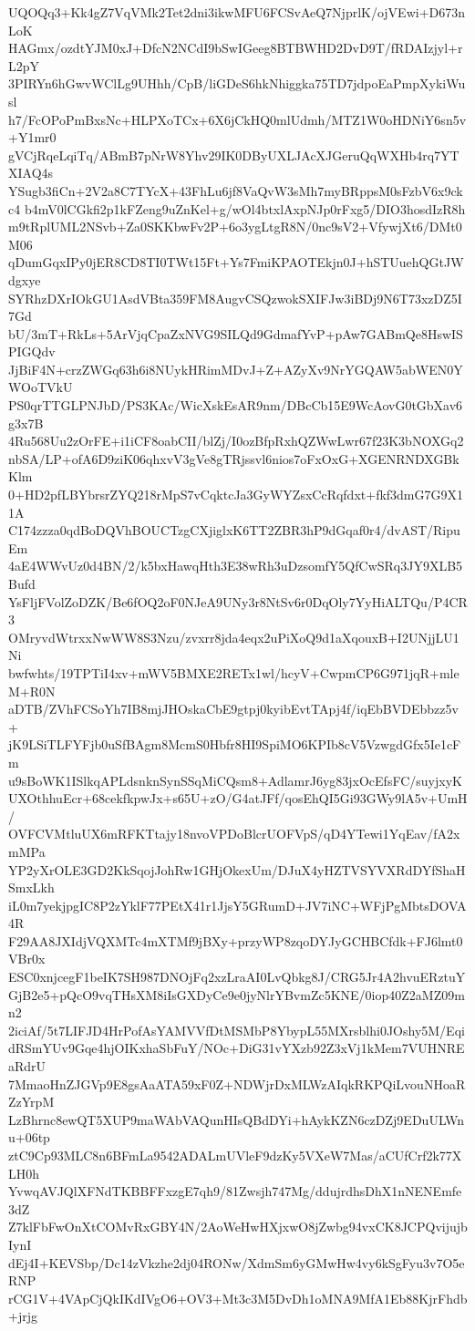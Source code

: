 UQOQq3+Kk4gZ7VqVMk2Tet2dni3ikwMFU6FCSvAeQ7NjprlK/ojVEwi+D673nLoK
HAGmx/ozdtYJM0xJ+DfcN2NCdI9bSwIGeeg8BTBWHD2DvD9T/fRDAIzjyl+rL2pY
3PIRYn6hGwvWClLg9UHhh/CpB/liGDeS6hkNhiggka75TD7jdpoEaPmpXykiWusl
h7/FcOPoPmBxsNc+HLPXoTCx+6X6jCkHQ0mlUdmh/MTZ1W0oHDNiY6sn5v+Y1mr0
gVCjRqeLqiTq/ABmB7pNrW8Yhv29IK0DByUXLJAcXJGeruQqWXHb4rq7YTXIAQ4s
YSugb3fiCn+2V2a8C7TYcX+43FhLu6jf8VaQvW3sMh7myBRppsM0sFzbV6x9ckc4
b4mV0lCGkfi2p1kFZeng9uZnKel+g/wOl4btxlAxpNJp0rFxg5/DIO3hosdIzR8h
m9tRplUML2NSvb+Za0SKKbwFv2P+6o3ygLtgR8N/0nc9sV2+VfywjXt6/DMt0M06
qDumGqxIPy0jER8CD8TI0TWt15Ft+Ys7FmiKPAOTEkjn0J+hSTUuehQGtJWdgxye
SYRhzDXrIOkGU1AsdVBta359FM8AugvCSQzwokSXIFJw3iBDj9N6T73xzDZ5I7Gd
bU/3mT+RkLs+5ArVjqCpaZxNVG9SILQd9GdmafYvP+pAw7GABmQe8HswISPIGQdv
JjBiF4N+crzZWGq63h6i8NUykHRimMDvJ+Z+AZyXv9NrYGQAW5abWEN0YWOoTVkU
PS0qrTTGLPNJbD/PS3KAc/WicXskEsAR9nm/DBcCb15E9WcAovG0tGbXav6g3x7B
4Ru568Uu2zOrFE+i1iCF8oabCII/blZj/I0ozBfpRxhQZWwLwr67f23K3bNOXGq2
nbSA/LP+ofA6D9ziK06qhxvV3gVe8gTRjssvl6nios7oFxOxG+XGENRNDXGBkKlm
0+HD2pfLBYbrsrZYQ218rMpS7vCqktcJa3GyWYZsxCcRqfdxt+fkf3dmG7G9X11A
C174zzza0qdBoDQVhBOUCTzgCXjiglxK6TT2ZBR3hP9dGqaf0r4/dvAST/RipuEm
4aE4WWvUz0d4BN/2/k5bxHawqHth3E38wRh3uDzsomfY5QfCwSRq3JY9XLB5Bufd
YsFljFVolZoDZK/Be6fOQ2oF0NJeA9UNy3r8NtSv6r0DqOly7YyHiALTQu/P4CR3
OMryvdWtrxxNwWW8S3Nzu/zvxrr8jda4eqx2uPiXoQ9d1aXqouxB+I2UNjjLU1Ni
bwfwhts/19TPTiI4xv+mWV5BMXE2RETx1wl/hcyV+CwpmCP6G971jqR+mleM+R0N
aDTB/ZVhFCSoYh7IB8mjJHOskaCbE9gtpj0kyibEvtTApj4f/iqEbBVDEbbzz5v+
jK9LSiTLFYFjb0uSfBAgm8McmS0Hbfr8HI9SpiMO6KPIb8cV5VzwgdGfx5Ie1cFm
u9sBoWK1ISlkqAPLdsnknSynSSqMiCQsm8+AdlamrJ6yg83jxOcEfsFC/suyjxyK
UXOthhuEcr+68cekfkpwJx+s65U+zO/G4atJFf/qosEhQI5Gi93GWy9lA5v+UmH/
OVFCVMtluUX6mRFKTtajy18nvoVPDoBlcrUOFVpS/qD4YTewi1YqEav/fA2xmMPa
YP2yXrOLE3GD2KkSqojJohRw1GHjOkexUm/DJuX4yHZTVSYVXRdDYfShaHSmxLkh
iL0m7yekjpgIC8P2zYklF77PEtX41r1JjsY5GRumD+JV7iNC+WFjPgMbtsDOVA4R
F29AA8JXIdjVQXMTc4mXTMf9jBXy+przyWP8zqoDYJyGCHBCfdk+FJ6lmt0VBr0x
ESC0xnjcegF1beIK7SH987DNOjFq2xzLraAI0LvQbkg8J/CRG5Jr4A2hvuERztuY
GjB2e5+pQcO9vqTHsXM8iIsGXDyCe9e0jyNlrYBvmZc5KNE/0iop40Z2aMZ09mn2
2iciAf/5t7LIFJD4HrPofAsYAMVVfDtMSMbP8YbypL55MXrsblhi0JOshy5M/Eqi
dRSmYUv9Gqe4hjOIKxhaSbFuY/NOc+DiG31vYXzb92Z3xVj1kMem7VUHNREaRdrU
7MmaoHnZJGVp9E8gsAaATA59xF0Z+NDWjrDxMLWzAIqkRKPQiLvouNHoaRZzYrpM
LzBhrnc8ewQT5XUP9maWAbVAQunHIsQBdDYi+hAykKZN6czDZj9EDuULWnu+06tp
ztC9Cp93MLC8n6BFmLa9542ADALmUVleF9dzKy5VXeW7Mas/aCUfCrf2k77XLH0h
YvwqAVJQlXFNdTKBBFFxzgE7qh9/81Zwsjh747Mg/ddujrdhsDhX1nNENEmfe3dZ
Z7klFbFwOnXtCOMvRxGBY4N/2AoWeHwHXjxwO8jZwbg94vxCK8JCPQvijujbIynI
dEj4I+KEVSbp/Dc14zVkzhe2dj04RONw/XdmSm6yGMwHw4vy6kSgFyu3v7O5eRNP
rCG1V+4VApCjQkIKdIVgO6+OV3+Mt3c3M5DvDh1oMNA9MfA1Eb88KjrFhdb+jrjg
